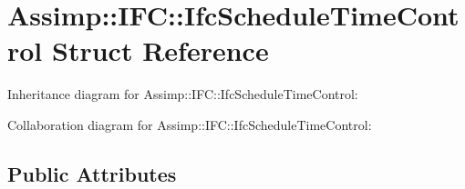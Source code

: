 \hypertarget{struct_assimp_1_1_i_f_c_1_1_ifc_schedule_time_control}{\section{Assimp\+:\+:I\+F\+C\+:\+:Ifc\+Schedule\+Time\+Control Struct Reference}
\label{struct_assimp_1_1_i_f_c_1_1_ifc_schedule_time_control}
}


Inheritance diagram for Assimp\+:\+:I\+F\+C\+:\+:Ifc\+Schedule\+Time\+Control\+:


Collaboration diagram for Assimp\+:\+:I\+F\+C\+:\+:Ifc\+Schedule\+Time\+Control\+:
\subsection*{Public Attributes}
